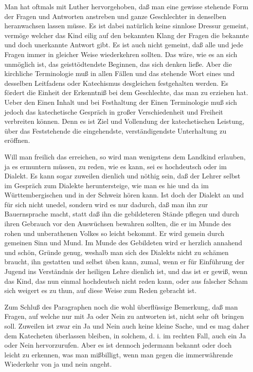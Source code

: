 Man hat oftmals mit Luther hervorgehoben, daß man eine gewisse stehende Form der Fragen und Antworten anstreben und ganze Geschlechter in denselben heranwachsen lassen müsse. Es ist dabei natürlich keine sinnlose Dressur gemeint,
vermöge welcher das Kind eilig auf den bekannten Klang der Fragen die bekannte und doch unerkannte Antwort gibt. Es ist auch nicht gemeint, daß alle und jede Fragen immer in gleicher Weise wiederkehren sollten. Das wäre, wie es an sich unmöglich ist, das geisttödtendste Beginnen, das sich denken ließe. Aber die kirchliche Terminologie muß in allen Fällen und das stehende Wort eines und desselben Leitfadens oder Katechismus desgleichen festgehalten werden. Es fördert die Einheit der Erkenntniß bei dem Geschlechte, das man zu erziehen hat. Ueber den Einen Inhalt und bei Festhaltung der Einen Terminologie muß sich jedoch das katechetische Gespräch in großer Verschiedenheit und Freiheit verbreiten können. Denn es ist Ziel und Vollendung der katechetischen Leistung, über das Feststehende die eingehendste, verständigendste Unterhaltung zu eröffnen.

Will man freilich das erreichen, so wird man wenigstens dem Landkind erlauben, ja es ermuntern müssen, zu reden, wie es kann, sei es hochdeutsch oder im Dialekt. Es kann sogar zuweilen dienlich und nöthig sein, daß der Lehrer selbst im Gespräch zum Dialekte heruntersteige, wie man es hie und da im Württembergischen und in der Schweiz hören kann. Ist doch der Dialekt an und für sich nicht unedel, sondern wird es nur dadurch, daß man ihn zur Bauernsprache macht, statt daß ihn die gebildeteren Stände pflegen und durch ihren Gebrauch vor den Auswüchsen bewahren sollten, die er im Munde des rohen und unberathenen Volkes so leicht bekommt. Er wird gemein durch gemeinen Sinn und Mund. Im Munde
des Gebildeten wird er herzlich annahend und schön, Gründe genug, weshalb man sich des Dialekts nicht zu schämen braucht, ihn gestatten und selbst üben kann, zumal, wenn er für Einführung der Jugend ins Verständnis der heiligen Lehre dienlich ist, und das ist er gewiß, wenn das Kind, das nun einmal hochdeutsch nicht reden kann, oder aus falscher Scham sich weigert es zu thun, auf diese Weise zum Reden gebracht ist.

Zum Schluß des Paragraphen noch die wohl überflüssige Bemerkung, daß man Fragen, auf welche nur mit Ja oder Nein zu antworten ist, nicht sehr oft bringen soll. Zuweilen ist zwar ein Ja und Nein auch keine kleine Sache, und es mag daher dem Katecheten überlassen bleiben, in solchem, d. i. im rechten Fall, auch ein Ja oder Nein hervorzurufen. Aber es ist dennoch jedermann bekannt oder doch leicht zu erkennen, was man mißbilligt, wenn man gegen die immerwährende Wiederkehr von ja und nein angeht.


